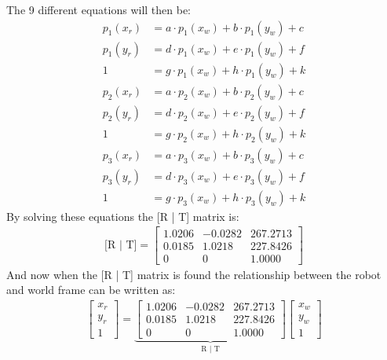 The 9 different equations will then be:
\begin{align*} 
p_1(x_r) &= a\cdot p_1(x_w) + b\cdot p_1(y_w) + c \\
p_1(y_r) &= d\cdot p_1(x_w) + e\cdot p_1(y_w) + f \\
1 &= g\cdot p_1(x_w) + h\cdot p_1(y_w) + k \\
p_2(x_r) &= a\cdot p_2(x_w) + b\cdot p_2(y_w) + c\\
p_2(y_r) &= d\cdot p_2(x_w) + e\cdot p_2(y_w) + f \\
1 &= g\cdot p_2(x_w) + h\cdot p_2(y_w) + k \\
p_3(x_r) &= a\cdot p_3(x_w) + b\cdot p_3(y_w) + c \\
p_3(y_r) &= d\cdot p_3(x_w) + e\cdot p_3(y_w) + f \\
1 &= g\cdot p_3(x_w) + h\cdot p_3(y_w) + k
\end{align*}
By solving these equations the [R | T] matrix is:
\begin{align*}
\text{[R | T]} = 
\begin{bmatrix}
1.0206 & -0.0282 & 267.2713 \\
0.0185 & 1.0218 & 227.8426 \\
0 & 0 & 1.0000 
\end{bmatrix}
\end{align*}
And now when the [R | T] matrix is found the relationship between the robot and world frame can be written as:
\begin{align*}
\begin{bmatrix}
x_r \\
y_r \\
1 
\end{bmatrix}
= \underbrace{\begin{bmatrix}
1.0206 & -0.0282 & 267.2713 \\
0.0185 & 1.0218 & 227.8426 \\
0 & 0 & 1.0000 
\end{bmatrix}}_{\text{R | T}}
\begin{bmatrix}
x_w \\
y_w \\
1 
\end{bmatrix}
\end{align*}

